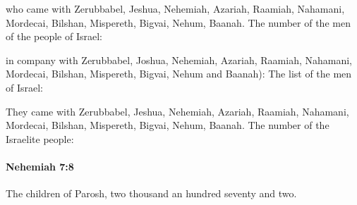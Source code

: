			\begin{versebox}
					\item[BHS] 
					\item[LXX] 
					\item[ASV] who came with Zerubbabel, Jeshua, Nehemiah, Azariah, Raamiah, Nahamani, Mordecai, Bilshan, Mispereth, Bigvai, Nehum, Baanah. The number of the men of the people of Israel:
					\item[NIV] in company with Zerubbabel, Joshua, Nehemiah, Azariah, Raamiah, Nahamani, Mordecai, Bilshan, Mispereth, Bigvai, Nehum and Baanah): The list of the men of Israel:
					\item[NRSV] They came with Zerubbabel, Jeshua, Nehemiah, Azariah, Raamiah, Nahamani, Mordecai, Bilshan, Mispereth, Bigvai, Nehum, Baanah. The number of the Israelite people:
			\end{versebox}

		\paragraph{Nehemiah 7:8} %
			\label{NEHEMIAH-7-8}

			The children of Parosh, two thousand an hundred seventy and two.

